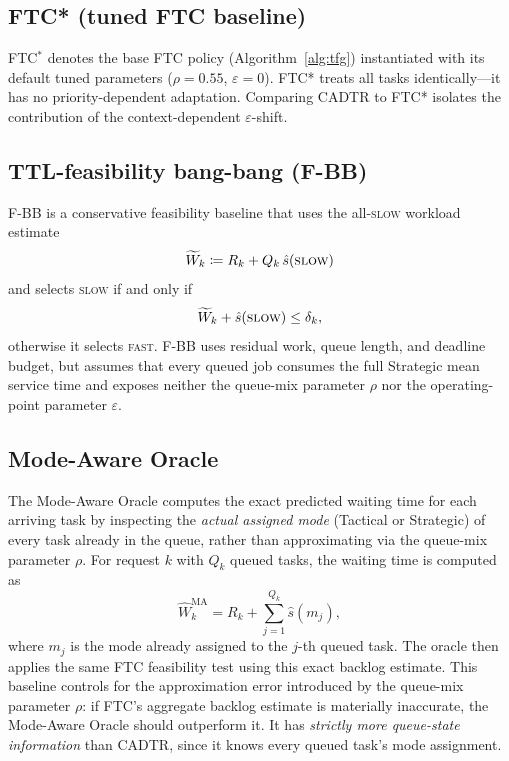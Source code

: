 \documentclass[preprint,12pt]{elsarticle}
\begin{document}
\subsection{FTC* (tuned FTC baseline)}
\label{sec:baseline_ftcstar}

FTC$^{\ast}$ denotes the base FTC policy (Algorithm~\ref{alg:tfg}) instantiated with its default tuned parameters ($\rho=0.55$, $\varepsilon=0$). FTC* treats all tasks identically---it has no priority-dependent adaptation. Comparing CADTR to FTC* isolates the contribution of the context-dependent $\varepsilon$-shift.

\subsection{TTL-feasibility bang-bang (F-BB)}
\label{sec:baseline_fbb}

F-BB is a conservative feasibility baseline that uses the all-\textsc{slow} workload estimate
\[
\widetilde{W}_k \coloneqq R_k + Q_k\,\hat{s}(\textsc{slow})
\]
and selects \textsc{slow} if and only if
\begin{equation}
\widetilde{W}_k + \hat{s}(\textsc{slow}) \le \delta_k,
\label{eq:baseline_ttl_bangbang}
\end{equation}
otherwise it selects \textsc{fast}. F-BB uses residual work, queue length, and deadline budget, but assumes that every queued job consumes the full Strategic mean service time and exposes neither the queue-mix parameter $\rho$ nor the operating-point parameter $\varepsilon$.

\subsection{Mode-Aware Oracle}
\label{sec:baseline_mode_aware}

The Mode-Aware Oracle computes the exact predicted waiting time for each arriving task by inspecting the \emph{actual assigned mode} (Tactical or Strategic) of every task already in the queue, rather than approximating via the queue-mix parameter $\rho$. For request $k$ with $Q_k$ queued tasks, the waiting time is computed as
\begin{equation}
\widehat{W}_k^{\mathrm{MA}} = R_k + \sum_{j=1}^{Q_k} \hat{s}(m_j),
\label{eq:mode_aware_wait}
\end{equation}
where $m_j$ is the mode already assigned to the $j$-th queued task. The oracle then applies the same FTC feasibility test using this exact backlog estimate. This baseline controls for the approximation error introduced by the queue-mix parameter $\rho$: if FTC's aggregate backlog estimate is materially inaccurate, the Mode-Aware Oracle should outperform it. It has \emph{strictly more queue-state information} than CADTR, since it knows every queued task's mode assignment.
\end{document}
